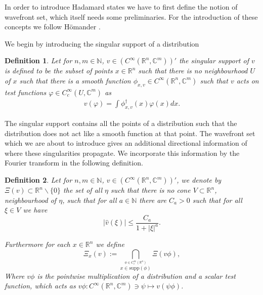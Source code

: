 \documentclass[b5paper,draft,openbib,12pt]{memoir}
\newtheorem{Def}{Definition}
\begin{document}
In order to introduce Hadamard states we have to first define the notion of wavefront set, which itself needs some preliminaries. 
For the introduction of these concepts we follow Hömander \cite[Chapter 8]{hormander2003analysis}.

We begin by introducing the singular support of a distribution

\begin{Def}
Let for \(n,m\in\mathbb{N}\),  \(v\in (C^\infty(\mathbb{R}^n,\mathbb{C}^m))'\) the singular support of \(v\) is defined to be the subset of points \(x\in \mathbb{R}^n\) such
that there is no neighbourhood \(U\) of \(x\) such that there is a smooth function \(\phi_{x,v}\in C^\infty (\mathbb{R}^n,\mathbb{C}^m)\) such that \(v\) acts on 
test functions \(\varphi \in C^\infty_c (U,\mathbb{C}^m)\) as
\begin{align}
v(\varphi)=\int \phi^\dagger_{x,v} (x) \varphi(x) dx.
\end{align}
\end{Def}

The singular support contains all the points of a distribution such that the distribution does not act like a smooth function at that point. The wavefront set which we are
about to introduce gives an additional directional information of where these singularities propagate. We incorporate this information by the Fourier transform 
in the following definition.

\begin{Def}
Let for \(n,m\in\mathbb{N}\),  \(v\in (C^\infty(\mathbb{R}^n,\mathbb{C}^m))'\), we denote by \(\Xi(v)\subset \mathbb{R}^n\backslash\{0\}\) the set of all \(\eta\) such that there is no
cone \(V\subset \mathbb{R}^n\), neighbourhood of \(\eta\), such that for all \(a\in\mathbb{N}\) there are \(C_a>0\) such that for all \(\xi\in V\) we have
\begin{equation}
|\hat{v}(\xi)|\le \frac{C_a}{1+|\xi|^a}.
\end{equation}

Furthermore for each \(x\in \mathbb{R}^n\) we define 
\begin{equation}
\Xi_x (v) := \bigcap_{\overset{\phi \in C^\infty_c (\mathbb{R}^n)}{x\in \mathrm{supp}(\phi)}} \Xi(v \phi),
\end{equation}
Where \(v\phi\) is the pointwise multiplication of a distribution and a scalar test function, which acts as \(v\phi: C^\infty(\mathbb{R}^n,\mathbb{C}^m)\ni \psi\mapsto v(\psi \phi)\). 
\end{Def}
\end{document}
